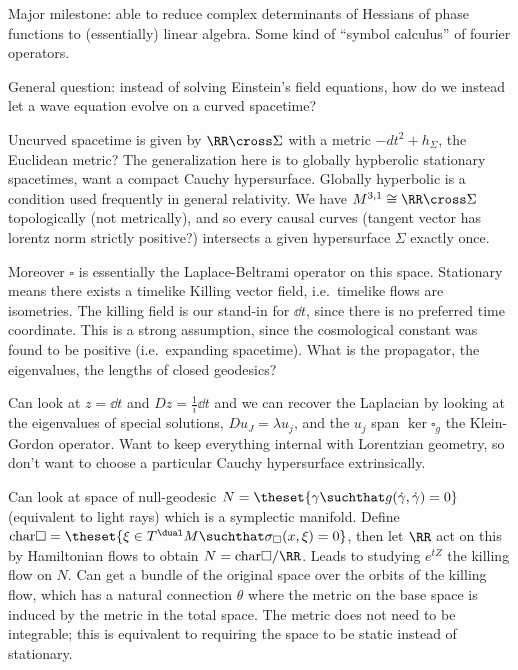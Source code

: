 Major milestone: able to reduce complex determinants of Hessians of
phase functions to (essentially) linear algebra. Some kind of ``symbol
calculus'' of fourier operators.

General question: instead of solving Einstein's field equations, how do
we instead let a wave equation evolve on a curved spacetime?

Uncurved spacetime is given by \(\RR \cross \Sigma\) with a metric
\(-dt^2 + h_\Sigma\), the Euclidean metric? The generalization here is
to globally hypberolic stationary spacetimes, want a compact Cauchy
hypersurface. Globally hyperbolic is a condition used frequently in
general relativity. We have \(M^{3,1} \cong \RR \cross \Sigma\)
topologically (not metrically), and so every causal curves (tangent
vector has lorentz norm strictly positive?) intersects a given
hypersurface \(\Sigma\) exactly once.

Moreover \(\square\) is essentially the Laplace-Beltrami operator on
this space. Stationary means there exists a timelike Killing vector
field, i.e.~timelike flows are isometries. The killing field is our
stand-in for \(\dd{}{t}\), since there is no preferred time coordinate.
This is a strong assumption, since the cosmological constant was found
to be positive (i.e.~expanding spacetime). What is the propagator, the
eigenvalues, the lengths of closed geodesics?

Can look at \(z = \dd{}{t}\) and \(Dz = \frac 1 i \dd{}{t}\) and we can
recover the Laplacian by looking at the eigenvalues of special
solutions, \(Du_J = \lambda u_j\), and the \(u_j\) span
\(\ker \square_g\) the Klein-Gordon operator. Want to keep everything
internal with Lorentzian geometry, so don't want to choose a particular
Cauchy hypersurface extrinsically.

Can look at space of null-geodesic
\(N = \theset{\gamma \suchthat g(\dot\gamma, \dot\gamma) = 0}\)
(equivalent to light rays) which is a symplectic manifold. Define
\(\mathrm{char}\square = \theset{\xi \in T^\dual M \suchthat \sigma_\square (x, \xi) = 0}\),
then let \(\RR\) act on this by Hamiltonian flows to obtain
\(N = \mathrm{char}\square/\RR\). Leads to studying \(e^{tZ}\) the
killing flow on \(N\). Can get a bundle of the original space over the
orbits of the killing flow, which has a natural connection \(\theta\)
where the metric on the base space is induced by the metric in the total
space. The metric does not need to be integrable; this is equivalent to
requiring the space to be static instead of stationary.

